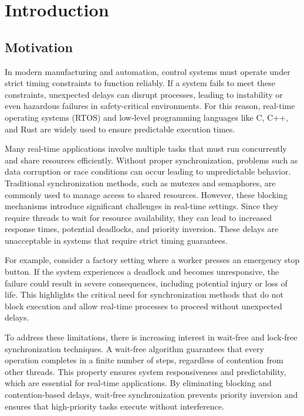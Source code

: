 \chapter{Introduction}

\section{Motivation}

In modern manufacturing and automation, control systems must operate under strict timing constraints to function reliably. If a system fails to meet these constraints, unexpected delays can disrupt processes, leading to instability or even hazardous failures in safety-critical environments. For this reason, real-time operating systems (RTOS) and low-level programming languages like C, C++, and Rust are widely used to ensure predictable execution times.

Many real-time applications involve multiple tasks that must run concurrently and share resources efficiently. Without proper synchronization, problems such as data corruption or race conditions can occur leading to unpredictable behavior. Traditional synchronization methods, such as mutexes and semaphores, are commonly used to manage access to shared resources. However, these blocking mechanisms introduce significant challenges in real-time settings. Since they require threads to wait for resource availability, they can lead to increased response times, potential deadlocks, and priority inversion. These delays are unacceptable in systems that require strict timing guarantees. \cite{herlihy1991wait, brandenburg2019multiprocessorrealtimelockingprotocols, kode2024analysisSynchronization}

For example, consider a factory setting where a worker presses an emergency stop button. If the system experiences a deadlock and becomes unresponsive, the failure could result in severe consequences, including potential injury or loss of life. This highlights the critical need for synchronization methods that do not block execution and allow real-time processes to proceed without unexpected delays.

To address these limitations, there is increasing interest in wait-free and lock-free synchronization techniques. A wait-free algorithm guarantees that every operation completes in a finite number of steps, regardless of contention from other threads. This property ensures system responsiveness and predictability, which are essential for real-time applications. By eliminating blocking and contention-based delays, wait-free synchronization prevents priority inversion and ensures that high-priority tasks execute without interference. \cite{kogan2012methodology, herlihy1991wait}

